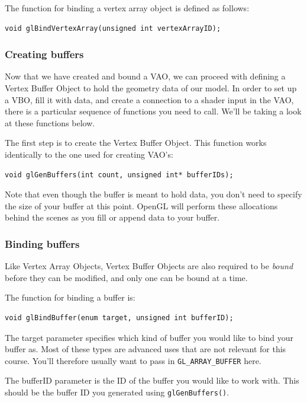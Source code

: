 The function for binding a vertex array object is defined as follows:

\begin{verbatim}
void glBindVertexArray(unsigned int vertexArrayID);
\end{verbatim}

\subsubsection{Creating buffers}

Now that we have created and bound a VAO, we can proceed with defining a Vertex Buffer Object to hold the geometry data of our model. In order to set up a VBO, fill it with data, and create a connection to a shader input in the VAO, there is a particular sequence of functions you need to call. We'll be taking a look at these functions below.

The first step is to create the Vertex Buffer Object. This function works identically to the one used for creating VAO's:

\begin{verbatim}
void glGenBuffers(int count, unsigned int* bufferIDs);
\end{verbatim}

Note that even though the buffer is meant to hold data, you don't need to specify the size of your buffer at this point. OpenGL will perform these allocations behind the scenes as you fill or append data to your buffer.

\subsubsection{Binding buffers}

Like Vertex Array Objects, Vertex Buffer Objects are also required to be \emph{bound} before they can be modified, and only one can be bound at a time. 

The function for binding a buffer is:

\begin{verbatim}
void glBindBuffer(enum target, unsigned int bufferID);
\end{verbatim}

The target parameter specifies which kind of buffer you would like to bind your buffer as. Most of these types are advanced uses that are not relevant for this course. You'll therefore usually want to pass in \texttt{GL_ARRAY_BUFFER} here.

The bufferID parameter is the ID of the buffer you would like to work with. This should be the buffer ID you generated using \texttt{glGenBuffers()}.

